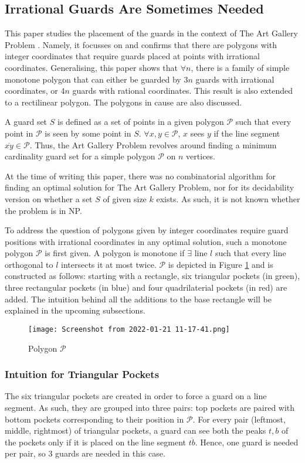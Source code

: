 \subsection{Irrational Guards Are Sometimes Needed \cite{abrahamsen2021art}}
This paper \cite{abrahamsen2021art} studies the placement of the guards in the context of The Art Gallery Problem \cite{o1987art}. Namely, it focusses on and confirms that there are polygons with integer coordinates that require guards placed at points with irrational coordinates. Generalising, this paper shows that $\forall n$, there is a family of simple monotone polygon that can either be guarded by $3n$ guards with irrational coordinates, or $4n$ guards with rational coordinates. This result is also extended to a rectilinear polygon. The polygons in cause are also discussed.

A guard set $S$ is defined as a set of points in a given polygon $\mathcal P$ such that every point in $\mathcal P$ is seen by some point in $S$. $\forall x, y \in \mathcal P$, $x$ sees $y$ if the line segment $\overline{xy} \in \mathcal P$. Thus, the Art Gallery Problem revolves around finding a minimum cardinality guard set for a simple polygon $\mathcal P$ on $n$ vertices.

At the time of writing this paper, there was no combinatorial algorithm for finding an optimal solution for The Art Gallery Problem, nor for its decidability version on whether a set $S$ of given size $k$ exists. As such, it is not known whether the problem is in NP.

To address the question of polygons given by integer coordinates require guard positions with irrational coordinates in any optimal solution, such a monotone polygon $\mathcal P$ is first given. A polygon is monotone if $\exists$ line $l$ such that every line orthogonal to $l$ intersects it at most twice. $\mathcal P$ is depicted in Figure \ref{fig:p} and is constructed as follows: starting with a rectangle, six triangular pockets (in green), three rectangular pockets (in blue) and four quadrilaterial pockets (in red) are added. The intuition behind all the additions to the base rectangle will be explained in the upcoming subsections.

\begin{figure}[h!]
    \centering
    \texttt{[image: Screenshot from 2022-01-21 11-17-41.png]}
    \caption{Polygon $\mathcal P$}
    \label{fig:p}
\end{figure}

\subsubsection{Intuition for Triangular Pockets}
The six triangular pockets are created in order to force a guard on a line segment. As such, they are grouped into three pairs: top pockets are paired with bottom pockets corresponding to their position in $\mathcal P$. For every pair (leftmost, middle, rightmost) of triangular pockets, a guard can see both the peaks $t, b$ of the pockets only if it is placed on the line segment $\overline{tb}$. Hence, one guard is needed per pair, so 3 guards are needed in this case.

